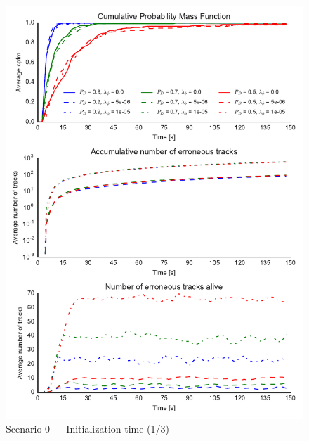 \begin{figure}
\centering
\includegraphics{Figures/plots/Scenario0_Init-Time(1-3).pdf}
\caption{Scenario 0 --- Initialization time (1/3)}\label{fig:init0_time_1-3}
\end{figure}

